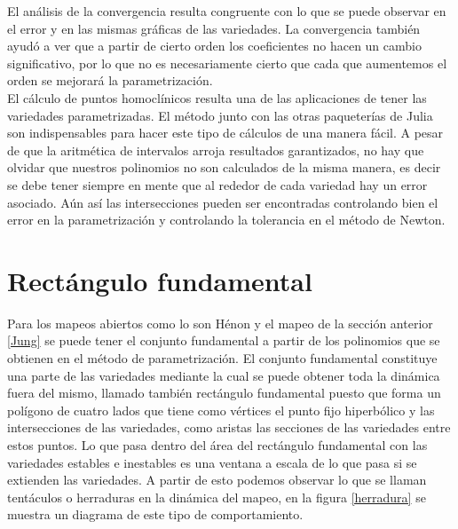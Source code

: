 El análisis de la convergencia resulta congruente con lo que se puede observar en el error y en las mismas gráficas de las variedades. La convergencia también ayudó a ver que a partir de cierto orden los coeficientes no hacen un cambio significativo, por lo que no es necesariamente cierto que cada que aumentemos el orden se mejorará la parametrización.\\


El cálculo de puntos homoclínicos resulta una de las aplicaciones de tener las variedades parametrizadas. El método junto con las otras paqueterías de Julia son indispensables para hacer este tipo de cálculos de una manera fácil. A pesar de que la aritmética de intervalos arroja resultados garantizados, no hay que olvidar que nuestros polinomios no son calculados de la misma manera, es decir se debe tener siempre en mente que al rededor de cada variedad hay un error asociado. Aún así las intersecciones pueden ser encontradas controlando bien el error en la parametrización y controlando la tolerancia en el método de Newton.

\label{SeccionRectanguloFundamental}\section{Rectángulo fundamental}
Para los mapeos abiertos como lo son Hénon y el mapeo de la sección anterior \eqref{Jung} se puede tener el conjunto fundamental a partir de los polinomios que se obtienen en el método de parametrización. El conjunto fundamental constituye una parte de las variedades mediante la cual se puede obtener toda la dinámica fuera del mismo, llamado también rectángulo fundamental puesto que forma un polígono de cuatro lados que tiene como vértices el punto fijo hiperbólico y las intersecciones de las variedades, como aristas las secciones de las variedades entre estos puntos. Lo que pasa dentro del área del rectángulo fundamental con las variedades estables e inestables es una ventana a escala de lo que pasa si se extienden las variedades. A partir de esto podemos observar lo que se llaman tentáculos o herraduras en la dinámica del mapeo, en la figura \ref{herradura} se muestra un diagrama de este tipo de comportamiento.

